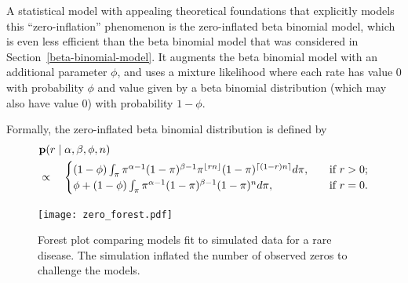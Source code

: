 A statistical model with appealing theoretical foundations that
explicitly models this ``zero-inflation'' phenomenon is the
zero-inflated beta binomial model, which is even less efficient than
the beta binomial model that was considered in
Section~\ref{beta-binomial-model}.  It augments the beta binomial
model with an additional parameter $\phi$, and uses a mixture
likelihood where each rate has value $0$ with probability $\phi$ and
value given by a beta binomial distribution (which may also have value
$0$) with probability $1-\phi$.

Formally, the zero-inflated beta binomial distribution is defined
by
\begin{align*}
&\mathbf{p}(r\;|\; \alpha, \beta, \phi, n)\\
&\propto\quad\begin{cases}
  (1-\phi)\int_{\pi} \pi^{\alpha-1}(1-\pi)^{\beta-1} \pi^{\lfloor
    rn\rfloor} (1-\pi)^{\lceil (1-r)n\rceil} d\pi, &\quad\text{if } r > 0; \\
  \phi + (1-\phi)\int_{\pi} \pi^{\alpha-1}(1-\pi)^{\beta-1}
  (1-\pi)^{n} d\pi, &\quad\text{if } r = 0.
\end{cases}
\end{align*}

\begin{figure}
\texttt{[image: zero\_forest.pdf]}
\caption{Forest plot comparing models fit to simulated data for a rare
  disease.  The simulation inflated the number of observed zeros to
  challenge the models.}
\label{zero-forest}
\end{figure}

